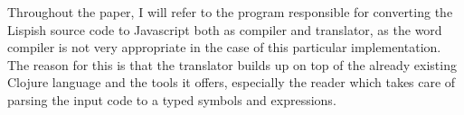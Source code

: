 \documentclass[11pt]{informatics-report}
\begin{document}
Throughout the paper, I will refer to the program responsible for converting the Lispish source code to Javascript both as compiler and translator, as the word 
compiler is not very appropriate in the case of this particular implementation. 
The reason for this is that the translator builds up on top of the already existing Clojure language and the tools it offers, especially the reader which takes care of parsing the input code to a typed symbols and expressions. 

\listoffigures









\nocite{*}

\appendix



\end{document}
